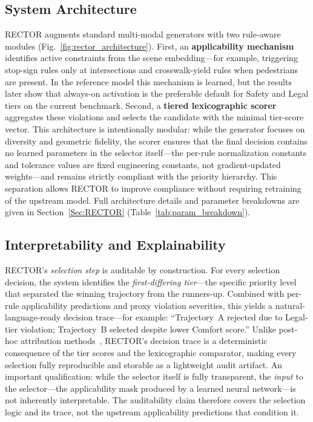 \subsection{System Architecture}
\label{subsec:architecture}

RECTOR augments standard multi-modal generators with two rule-aware modules (Fig.~\ref{fig:rector_architecture}).  First, an \textbf{applicability mechanism} identifies active constraints from the scene embedding—for example, triggering stop-sign rules only at intersections and crosswalk-yield rules when pedestrians are present.  In the reference model this mechanism is learned, but the results later show that always-on activation is the preferable default for Safety and Legal tiers on the current benchmark.  Second, a \textbf{tiered lexicographic scorer} aggregates these violations and selects the candidate with the minimal tier-score vector.  This architecture is intentionally modular: while the generator focuses on diversity and geometric fidelity, the scorer ensures that the final decision contains no learned parameters in the selector itself---the per-rule normalization constants and tolerance values are fixed engineering constants, not gradient-updated weights---and remains strictly compliant with the priority hierarchy. This separation allows \textsc{RECTOR} to improve compliance without requiring retraining of the upstream model.  Full architecture details and parameter breakdowns are given in Section~\ref{Sec:RECTOR} (Table~\ref{tab:param_breakdown}).

\subsection{Interpretability and Explainability}
\label{subsec:interpretability}

\textsc{RECTOR}'s \emph{selection step} is auditable by construction.  For every selection decision, the system identifies the \emph{first-differing tier}---the specific priority level that separated the winning trajectory from the runners-up.  Combined with per-rule applicability predictions and proxy violation severities, this yields a natural-language-ready decision trace---for example: ``Trajectory~A rejected due to Legal-tier violation; Trajectory~B selected despite lower Comfort score.''  Unlike post-hoc attribution methods~\cite{ribeiro2016why}, \textsc{RECTOR}'s decision trace is a deterministic consequence of the tier scores and the lexicographic comparator, making every selection fully reproducible and storable as a lightweight audit artifact.  An important qualification: while the selector itself is fully transparent, the \emph{input} to the selector---the applicability mask produced by a learned neural network---is not inherently interpretable.  The auditability claim therefore covers the selection logic and its trace, not the upstream applicability predictions that condition it.

